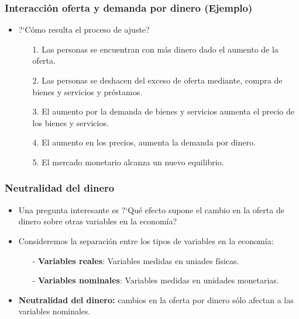 \documentclass{beamer}
\begin{document}
\begin{frame}
\frametitle{Interacci\'on oferta y demanda por dinero (Ejemplo)}
\begin{itemize}
\item ?`C\'omo resulta el proceso de ajuste?\\
\vspace{2mm}
\begin{itemize}
\setlength\itemsep{0.9em}
\item[1.] Las personas se encuentran con m\'as dinero dado el aumento de la oferta.
\item[2.] Las personas se deshacen del exceso de oferta mediante, compra de bienes y servicios y pr\'estamos.
\item[3.] El aumento por la demanda de bienes y servicios aumenta el precio de los bienes y servicios.
\item[4.] El aumento en los precios, aumenta la demanda por dinero.
\item[5.] El mercado monetario alcanza un nuevo equilibrio.
\end{itemize}
\end{itemize}
\end{frame}

\begin{frame}
\frametitle{Neutralidad del dinero}
\begin{itemize}
\setlength\itemsep{1.4em}
\item Una pregunta interesante es ?`Qu\'e efecto supone el cambio en la oferta de dinero sobre otras variables en la econom\'ia?
\item Consideremos la separaci\'on entre los tipos de variables en la econom\'ia:\\
\begin{itemize}
\setlength\itemsep{0.8em}
\item[-] \textbf{Variables reales}: Variables medidas en uniades f\'isicas.
\item[-] \textbf{Variables nominales}: Variables medidas en unidades monetarias.
\end{itemize}
\item \textbf{Neutralidad del dinero:} cambios en la oferta por dinero s\'olo afectan a las variables nominales.
\end{itemize}
\end{frame}
\end{document}
